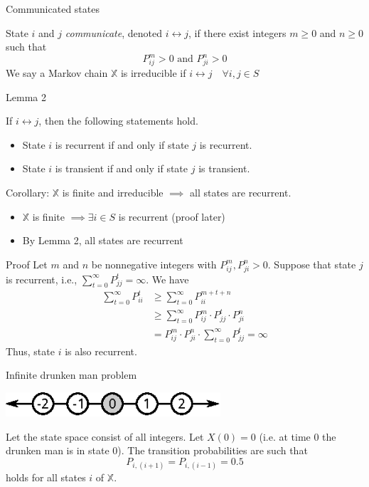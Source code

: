 \documentclass[mathserif]{beamer}
\begin{document}
\begin{frame}{Communicated states}
	\begin{definition}
	State $i$ and $j$ \textit{communicate}, denoted $i \leftrightarrow j$,
	if there exist integers $m \geq 0$ and $n \geq 0$ such that
	\[
	P^m_{ij} > 0 \text{ and } P^n_{ji} > 0
	\]
	We say a Markov chain $\mathbb{X}$ is irreducible if $i \leftrightarrow j \quad \forall i, j \in S$
	\end{definition}
\end{frame}

\begin{frame}{Lemma 2}
	\begin{lemma}
	If $i \leftrightarrow j$, then the following statements hold.
	\begin{itemize}
	\item State $i$ is recurrent if and only if state $j$ is recurrent.
	\item State $i$ is transient if and only if state $j$ is transient.
	\end{itemize}
	Corollary: $\mathbb{X}$ is finite and irreducible $\implies$ all states are recurrent.
	\begin{itemize}
	\item $\mathbb{X}$ is finite $\implies \exists i \in S$ is recurrent (proof later)
	\item By Lemma 2, all states are recurrent
	\end{itemize}
	\end{lemma}
\end{frame}

\begin{frame}{Proof}
	Let $m$ and $n$ be nonnegative integers with $P^m_{ij},  P^n_{ji} > 0$.
	Suppose that state $j$ is recurrent, i.e., $\sum_{t=0}^\infty P^t_{jj} = \infty$.
	We have
	\begin{align*}
	\sum_{t=0}^\infty P^t_{ii} & \geq \sum_{t=0}^\infty P^{m+t+n}_{ii} \\
	& \geq \sum_{t=0}^\infty P^m_{ij} \cdot P^t_{jj} \cdot P^n_{ji} \\
	& = P^m_{ij} \cdot P^n_{ji} \cdot \sum_{t=0}^\infty P^t_{jj} = \infty
	\end{align*}
	Thus, state $i$ is also recurrent.
\end{frame}

\begin{frame}{Infinite drunken man problem}
	\begin{center}
	\includegraphics[width=0.6\textwidth]{infinite_drunken.eps}
	\end{center}
	Let the state space consist of all integers.
	Let $X(0) = 0$ (i.e. at time 0 the drunken man is in state 0).
	The transition probabilities are such that
	\[
	P_{i, (i+1)} = P_{i, (i-1)} = 0.5
	\]
	holds for all states $i$ of $\mathbb{X}$.
\end{frame}
\end{document}
